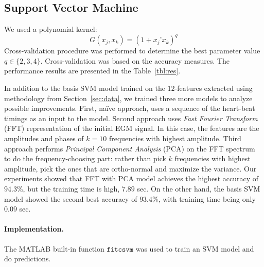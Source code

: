 \subsection{Support Vector Machine}
\label{sec:svm}

We used a polynomial kernel:
\begin{equation*}
G(x_{j},x_{k}) = (1+x_{j}’ x_{k})^{q}
\end{equation*}
Cross-validation procedure was performed to determine the best 
parameter value $q\in\{2,3,4\}$. Cross-validation was based 
on the accuracy measures. The performance results are presented in 
the Table~\ref{tbl:res}. 

In addition to the basis SVM model trained on the $12$-features 
extracted using methodology from Section~\ref{sec:data}, we trained 
three more models to analyze possible improvements. First, na\"ive 
approach, uses a sequence of the heart-beat timings as an input to 
the model.
Second approach uses \textit{Fast Fourier Transform} (FFT) 
representation of the initial EGM signal. In this case, the 
features are the amplitudes and phases of $k=10$ frequencies with 
highest amplitude. 
Third approach performs \textit{Principal Component Analysis} (PCA) 
on the FFT spectrum to do the frequency-choosing part: rather than 
pick $k$ frequencies with 
highest amplitude, pick the ones that are ortho-normal and maximize 
the variance. 
Our experiments showed that FFT with PCA model achieves the highest 
accuracy of $94.3\%$, but the training time is high, $7.89$ sec. On 
the other hand, the 
basis SVM model showed the second best 
accuracy of $93.4\%$, with training time being only $0.09$ sec.
  
\paragraph{Implementation.}
The MATLAB built-in function $\mathtt{fitcsvm}$ was used to train an 
SVM model and do predictions.


